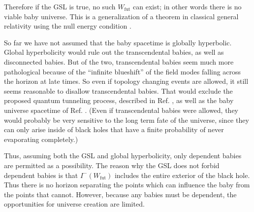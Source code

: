 \documentclass{article}
\begin{document}
Therefore if the GSL is true, no such $W_\mathrm{fut}$ can exist; in other words there is no viable baby universe.  This is a generalization of a theorem in classical general relativity using the null energy condition \cite{obstacle}.


So far we have not assumed that the baby spacetime is globally hyperbolic.  Global hyperbolicity would rule out the transcendental babies, as well as disconnected babies.  But of the two, transcendental babies seem much more pathological because of the ``infinite blueshift'' of the field modes falling across the horizon at late times.  So even if topology changing events are allowed, it still seems reasonable to disallow transcendental babies.  That would exclude the proposed quantum tunneling process, described in Ref. \cite{monopole}, as well as the baby universe spacetime of Ref. \cite{FMM}.  (Even if transcendental babies were allowed, they would probably be very sensitive to the long term fate of the universe, since they can only arise inside of black holes that have a finite probability of never evaporating completely.)

Thus, assuming both the GSL and global hyperbolicity, only dependent babies are permitted as a possibility.  The reason why the GSL does not forbid dependent babies is that $I^-(W_\mathrm{fut})$ includes the entire exterior of the black hole.  Thus there is no horizon separating the points which can influence the baby from the points that cannot.  However, because any babies must be dependent, the opportunities for universe creation are limited.
\end{document}
